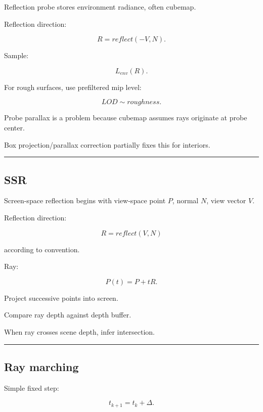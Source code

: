 Reflection probe stores environment radiance, often cubemap.

Reflection direction:

\[
R=
reflect(-V,N).
\]

Sample:

\[
L_{env}(R).
\]

For rough surfaces, use prefiltered mip level:

\[
LOD
\sim
roughness.
\]

Probe parallax is a problem because cubemap assumes rays originate at probe center.

Box projection/parallax correction partially fixes this for interiors.

\begin{center}\rule{0.5\linewidth}{0.5pt}\end{center}

\subsection{SSR}\label{04-visual-computing-ii-ch040-ssr}

\hypertarget{04-visual-computing-ii-ch040-ssr}{}

Screen-space reflection begins with view-space point \(P\), normal \(N\), view vector \(V\).

Reflection direction:

\[
R=
reflect(V,N)
\]

according to convention.

Ray:

\[
P(t)=P+tR.
\]

Project successive points into screen.

Compare ray depth against depth buffer.

When ray crosses scene depth, infer intersection.

\begin{center}\rule{0.5\linewidth}{0.5pt}\end{center}

\subsection{Ray marching}\label{04-visual-computing-ii-ch040-ray-marching}

\hypertarget{04-visual-computing-ii-ch040-ray-marching}{}

Simple fixed step:

\[
t_{k+1}=t_k+\Delta.
\]

